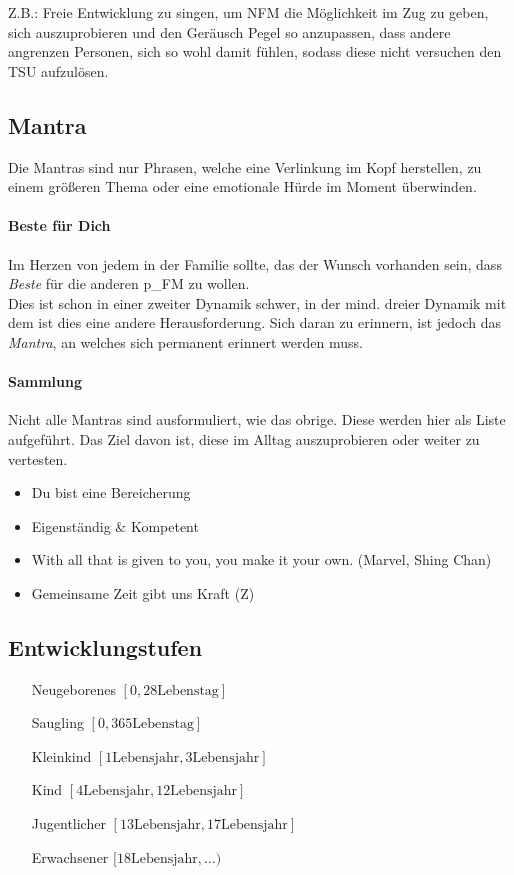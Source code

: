 Z.B.: Freie Entwicklung zu singen, um NFM die Möglichkeit im Zug zu geben, sich auszuprobieren und den Geräusch Pegel so anzupassen, dass andere angrenzen Personen, sich so wohl damit fühlen, sodass diese nicht versuchen den TSU aufzulösen.

\subsection{Mantra}
Die Mantras sind nur Phrasen, welche eine Verlinkung im Kopf herstellen, zu einem größeren Thema oder eine emotionale Hürde im Moment überwinden.


\paragraph{Beste für Dich}
Im Herzen von jedem in der Familie sollte, das der Wunsch vorhanden sein, dass \textit{Beste} für die anderen \gls{p_FM} zu wollen.\\


Dies ist schon in einer zweiter Dynamik schwer, in der mind. dreier Dynamik mit dem \NFMOOne ist dies eine andere Herausforderung. Sich daran zu erinnern, ist jedoch das \textit{Mantra}, an welches sich permanent erinnert werden muss.


\paragraph{Sammlung} 
Nicht alle Mantras sind ausformuliert, wie das obrige. Diese werden hier als Liste aufgeführt. Das Ziel davon ist, diese im Alltag auszuprobieren oder weiter zu vertesten. 

\begin{itemize}
	\item Du bist eine Bereicherung
	\item Eigenständig $\&$ Kompetent
	\item With all that is given to you, you make it your own. (Marvel, Shing Chan)
	\item Gemeinsame Zeit gibt uns Kraft (Z)
\end{itemize}

\subsection{Entwicklungstufen}

\begin{itemize}
	\item[Neugeborenes] $[0, 28 \text{Lebenstag}]$
	\item[Saugling] $[0,365 \text{Lebenstag}]$
	\item[Kleinkind] $[1 \text{Lebensjahr}, 3 \text{Lebensjahr}]$
	\item[Kind] $[4 \text{Lebensjahr}, 12 \text{Lebensjahr}]$
	\item[Jugentlicher] $[13 \text{Lebensjahr}, 17 \text{Lebensjahr}]$
	\item[Erwachsener] $[18 \text{Lebensjahr}, \dots )$
\end{itemize}



